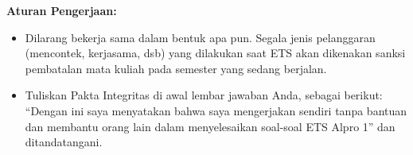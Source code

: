 \documentclass{article}
\begin{document}
\pagestyle{fancy}

\indent
\textbf{Aturan Pengerjaan:}
\begin{itemize}
    \item Dilarang bekerja sama dalam bentuk apa pun. Segala jenis pelanggaran (mencontek, kerjasama, dsb) yang dilakukan saat ETS akan dikenakan sanksi pembatalan mata kuliah pada semester yang sedang berjalan.
    \item Tuliskan Pakta Integritas di awal lembar jawaban Anda, sebagai berikut: ``Dengan ini saya menyatakan bahwa saya mengerjakan sendiri tanpa bantuan dan membantu orang lain dalam menyelesaikan soal-soal ETS Alpro 1'' dan ditandatangani.
\end{itemize}
\end{document}
